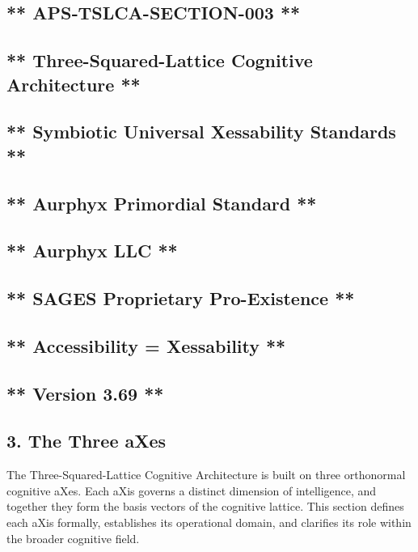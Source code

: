 \subsection{** APS‑TSLCA-SECTION-003 **}\label{apstslca-section-003}

\subsection{** Three-Squared-Lattice Cognitive Architecture **}\label{three-squared-lattice-cognitive-architecture}

\subsection{** Symbiotic Universal Xessability Standards **}\label{symbiotic-universal-xessability-standards}

\subsection{** Aurphyx Primordial Standard **}\label{aurphyx-primordial-standard}

\subsection{** Aurphyx LLC **}\label{aurphyx-llc}

\subsection{** SAGES \textbar{} Proprietary \textbar{} Pro-Existence **}\label{sages-proprietary-pro-existence}

\subsection{** Accessibility = Xessability **}\label{accessibility-xessability}

\subsection{** Version 3.69 **}\label{version-3.69}

\subsection{3. The Three aXes}\label{the-three-axes}

The Three-Squared-Lattice Cognitive Architecture is built on three orthonormal cognitive aXes. Each aXis governs a distinct dimension of intelligence, and together they form the basis vectors of the cognitive lattice. This section defines each aXis formally, establishes its operational domain, and clarifies its role within the broader cognitive field.

